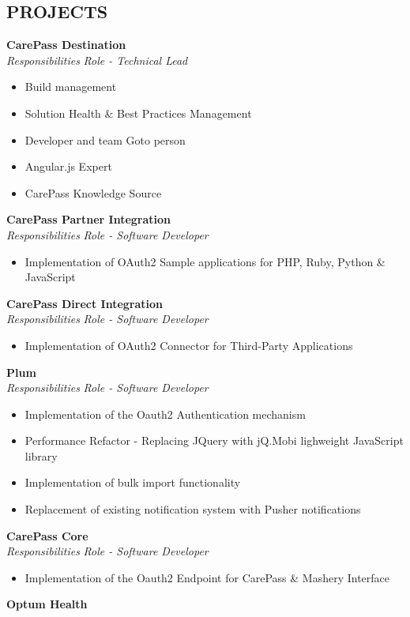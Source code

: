 \documentclass[margin]{res}
\begin{document}
\begin{resume}
\section{PROJECTS}
	{\bf CarePass Destination } \\
	{\sl Responsibilities} \hfill {\sl Role - Technical Lead}
	\begin{itemize}
	\item Build management
	\item Solution Health \& Best Practices Management
	\item Developer and team Goto person
	\item Angular.js Expert
	\item CarePass Knowledge Source
	\end{itemize}
	{\bf CarePass Partner Integration} \\
	{\sl Responsibilities} \hfill {\sl Role - Software Developer}
	\begin{itemize}
	\item Implementation of OAuth2 Sample applications for PHP, Ruby, Python \& JavaScript
	\end{itemize} 		
	{\bf CarePass Direct Integration} \\
	{\sl Responsibilities} \hfill {\sl Role - Software Developer}
	\begin{itemize}
	\item Implementation of OAuth2 Connector for Third-Party Applications
	\end{itemize} 
	{\bf Plum } \\
	{\sl Responsibilities} \hfill {\sl Role - Software Developer}
	\begin{itemize}
	\item Implementation of the Oauth2 Authentication mechanism 
	\item Performance Refactor - Replacing JQuery with jQ.Mobi lighweight JavaScript library
	\item Implementation of bulk import functionality
	\item Replacement of existing notification system with Pusher notifications
	\end{itemize}		
	{\bf CarePass Core} \\
	{\sl Responsibilities} \hfill {\sl Role - Software Developer}
	\begin{itemize}
	\item Implementation of the Oauth2 Endpoint for CarePass \& Mashery Interface
	\end{itemize} 
	{\bf Optum Health} \\

\end{resume}
\end{document}
